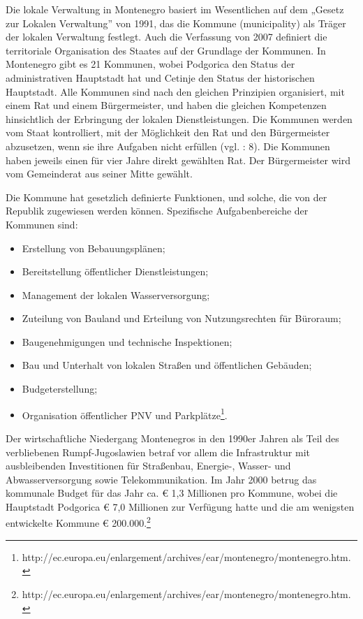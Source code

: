 Die lokale Verwaltung in Montenegro basiert im Wesentlichen auf dem „Gesetz zur Lokalen Verwaltung” von 1991, das die Kommune (municipality) als Träger der lokalen Verwaltung festlegt. Auch die Verfassung von 2007 definiert die territoriale Organisation des Staates auf der Grundlage der Kommunen. In Montenegro gibt es 21 Kommunen, wobei Podgorica den Status der administrativen Hauptstadt hat und Cetinje den Status der historischen Hauptstadt. Alle Kommunen sind nach den gleichen Prinzipien organisiert, mit einem Rat und einem Bürgermeister, und haben die gleichen Kompetenzen hinsichtlich der Erbringung der lokalen Dienstleistungen. Die Kommunen werden vom Staat kontrolliert, mit der Möglichkeit den Rat und den Bürgermeister abzusetzen, wenn sie ihre Aufgaben nicht erfüllen (vgl. \cite{oecd08b} : 8). Die Kommunen haben jeweils einen für vier Jahre direkt gewählten Rat. Der Bürgermeister wird vom Gemeinderat aus seiner Mitte gewählt.\par
Die Kommune hat gesetzlich definierte Funktionen, und solche, die von der Republik zugewiesen werden können. Spezifische Aufgabenbereiche der Kommunen sind:
\begin{itemize} \itemsep1pt \parskip0pt 
\item Erstellung von Bebauungsplänen;
\item Bereitstellung öffentlicher Dienstleistungen;
\item Management der lokalen Wasserversorgung;
\item Zuteilung von Bauland und Erteilung von Nutzungsrechten für Büroraum;
\item Baugenehmigungen und technische Inspektionen;
\item Bau und Unterhalt von lokalen Straßen und öffentlichen Gebäuden;
\item Budgeterstellung;
\item Organisation öffentlicher PNV und Parkplätze\footnote{http://ec.europa.eu/enlargement/archives/ear/montenegro/montenegro.htm.}. 
\end{itemize}
Der wirtschaftliche Niedergang Montenegros in den 1990er Jahren als Teil des verbliebenen Rumpf-Jugoslawien betraf vor allem die Infrastruktur mit ausbleibenden Investitionen für Straßenbau, Energie-, Wasser- und Abwasserversorgung sowie Telekommunikation. Im Jahr 2000 betrug das kommunale Budget für das Jahr ca.  \euro{}  1,3 Millionen pro Kommune, wobei die Hauptstadt Podgorica  \euro{}  7,0 Millionen zur Verfügung hatte und die am wenigsten entwickelte Kommune  \euro{} 200.000.\footnote{http://ec.europa.eu/enlargement/archives/ear/montenegro/montenegro.htm.}\par

